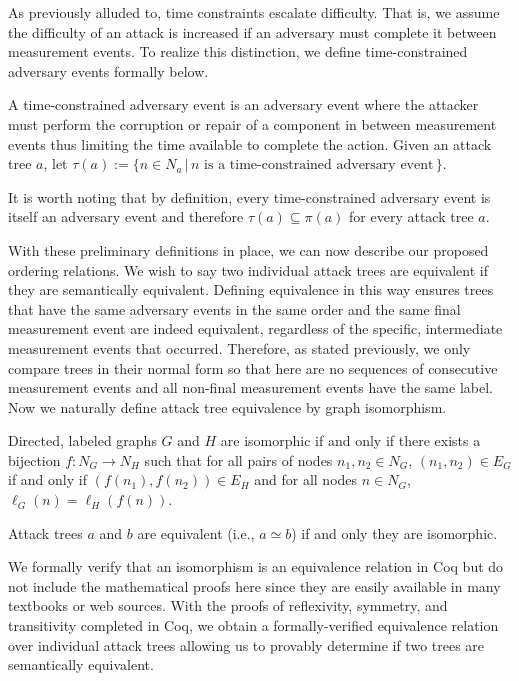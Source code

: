 \documentclass[runningheads]{llncs}
\theoremstyle{definition}
\begin{document}
As previously alluded to, time constraints escalate difficulty. That is, we assume the difficulty of an attack is increased if an adversary must complete it between measurement events. To realize this distinction, we define time-constrained adversary events formally below.  

\begin{definition}
    A time-constrained adversary event is an adversary event where the attacker must perform the corruption or repair of a component in between measurement events thus limiting the time available to complete the action. Given an attack tree $a$, let $\tau(a) := \{n \in N_a \,|\, n \text{ is a time-constrained adversary event}\,\}$.
\end{definition}

\noindent It is worth noting that by definition, every time-constrained adversary event is itself an adversary event and therefore $\tau(a) \subseteq \pi(a)$ for every attack tree $a$.


With these preliminary definitions in place, we can now describe our proposed ordering relations. We wish to say two individual attack trees are equivalent if they are semantically equivalent. Defining equivalence in this way ensures trees that have the same adversary events in the same order and the same final measurement event are indeed equivalent, regardless of the specific, intermediate measurement events that occurred. Therefore, as stated previously, we only compare trees in their normal form so that here are no sequences of consecutive measurement events and all non-final measurement events have the same label. Now we naturally define attack tree equivalence by graph isomorphism.


\begin{definition}[Isomorphism]
    Directed, labeled graphs $G$ and $H$ are isomorphic if and only if there exists a bijection $f : N_G \to N_H$ such that for all pairs of nodes $n_1, n_2 \in N_G$, $(n_1,n_2) \in E_G$ if and only if $(f(n_1),f(n_2)) \in E_H$ and for all nodes $n \in N_G$, $\ell_G(n) = \ell_H(f(n))$.
\end{definition}


\begin{definition}
  Attack trees $a$ and $b$ are equivalent (i.e., $a \simeq b$) if and only they are isomorphic.
\end{definition}


\noindent We formally verify that an isomorphism is an equivalence relation in Coq but do not include the mathematical proofs here since they are easily available in many textbooks or web sources. With the proofs of reflexivity, symmetry, and transitivity completed in Coq, we obtain a formally-verified equivalence relation over individual attack trees allowing us to provably determine if two trees are semantically equivalent.
\end{document}
